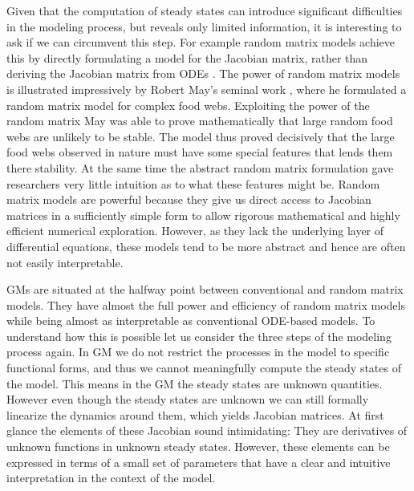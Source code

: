 \documentclass{article}
\begin{document}
Given that the computation of steady states can introduce significant difficulties in the modeling process, but reveals only limited information, it is interesting to ask if we can circumvent this step. For example random matrix models achieve this by directly formulating a model for the Jacobian matrix, rather than deriving the Jacobian matrix from ODEs \citep{wigner1955characteristic,May1972Nature,allesina2012stability}.
The power of random matrix models is illustrated impressively by Robert May's seminal work \citep{May1972Nature},
where he formulated a random matrix model for complex food webs. Exploiting the power of the random matrix May was able to 
prove mathematically that large random food webs are unlikely to be stable. The model thus proved decisively that the
large food webs observed in nature must have some special features that lends them there stability. At the same time the 
abstract random matrix formulation gave researchers very little intuition as to what these features might be.
Random matrix models are powerful because they give us direct access to Jacobian matrices in a sufficiently simple form 
to allow rigorous mathematical and highly efficient numerical exploration. However, as they lack the underlying layer of 
differential equations, these models tend to be more abstract and hence are often not easily interpretable. 

GMs are situated at the halfway point between conventional and random matrix models. They have almost the full power and efficiency
of random matrix models while being almost as interpretable as conventional ODE-based models. To understand how this is possible 
let us consider the three steps of the modeling process again. In GM we do not restrict the processes in the model to 
specific functional forms, and thus we cannot meaningfully compute the steady states of the model. This means in the GM 
the steady states are unknown quantities. However even though the steady states are unknown we can still formally linearize the dynamics around them, which yields Jacobian matrices. 
At first glance the elements of these Jacobian sound intimidating: They are derivatives of unknown functions in unknown steady states. However, these elements can be expressed in terms of a small set of parameters that have a clear and intuitive interpretation in the context of the model. 
\end{document}
